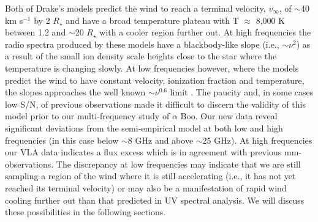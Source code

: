 \documentclass[iop]{emulateapj}
\begin{document}
Both of Drake's models predict the wind to reach a terminal velocity, $v_{\infty}$, of $\sim$40 km s${}^{-1}$ by 2 $R _{\star}$ and have a broad temperature plateau with T $\approx$ 8,000 K between 1.2 and $\sim$20 $R _{\star}$ with a cooler region further out. At high frequencies the radio spectra produced by these models have a blackbody-like slope (i.e., $\sim\nu ^{2}$) as a result of the small ion density scale heights close to the star where the temperature is changing slowly. At low frequencies however, where the models predict the wind to have constant velocity, ionization fraction and temperature, the slopes approaches the well known $\sim\nu ^{0.6}$ limit \citep{1975MNRAS.170...41W,1975AA....39..217O,1975AA....39....1P}. The paucity and, in some cases low S/N, of previous observations made it difficult to discern the validity of this model prior to our multi-frequency study of $\alpha$ Boo. Our new data reveal significant deviations from the semi-empirical model at both low and high frequencies (in this case below $\sim$8 GHz and above $\sim$25 GHz). At high frequencies our VLA data indicates a flux excess which is in agreement with previous mm-observations. The  discrepancy at low frequencies may indicate that we are still sampling a region of the wind where it is still accelerating (i.e., it has not yet reached its terminal velocity) or may also be a manifestation of rapid wind cooling further out than that predicted in UV spectral analysis. We will discuss these possibilities in the following sections.
\end{document}
